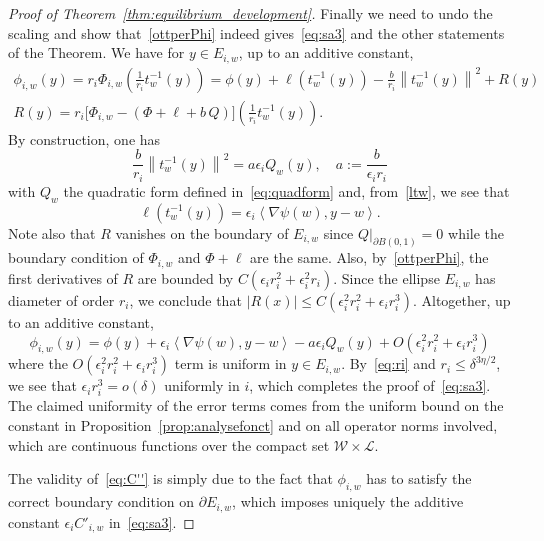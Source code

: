 \documentclass[AHL,Unicode,longabstracts,published]{cedram}
\newcommand{\clL}{\mathcal{L}}
\newcommand{\clW}{\mathcal{W}}
\newcommand{\eps}{\epsilon}
\begin{document}
\begin{proof}[Proof of Theorem~\ref{thm:equilibrium_development}]
Finally we need to undo the scaling and show that~\eqref{ottperPhi} indeed gives~\eqref{eq:sa3} and the other statements of the Theorem. We have for $y\in E_{i,w}$, up to an additive constant,
\begin{multline}
\phi_{i,w}(y)=r_i\Phi_{i,w}\left(\frac1{r_i}t_w^{-1}(y)\right)=\phi(y)+\ell\left(t_w^{-1}(y)\right)-\frac b{r_i} \left\|t_w^{-1} (y)\right\|^2+R(y)\\
R(y)={r_i}\Big[\Phi_{i,w}-(\Phi+\ell+b\, Q)\Big]\left(\frac1{r_i}t^{-1}_w(y)\right).
\end{multline}
By construction, one has
\begin{equation}
\frac b{r_i} \left\|t_w^{-1} (y)\right\|^2=a\epsilon_i Q_w(y),\quad a:=\frac b{\epsilon_i r_i}
\end{equation}
with $Q_w$ the quadratic form defined in~\eqref{eq:quadform} and, from~\eqref{ltw}, we see that
\begin{equation}
\ell\left(t_w^{-1}(y)\right)=\epsilon_i \left\langle\nabla\psi(w),y-w\right\rangle.
\end{equation}
Note also that $R$ vanishes on the boundary of $E_{i,w}$ since $Q|_{\partial B(0,1)}=0$ while the boundary condition of $\Phi_{i,w}$ and $\Phi+\ell$ are the same. Also, by~\eqref{ottperPhi}, the first derivatives of $R$ are bounded by $C(\epsilon_i r_i^2+\epsilon_i^2 r_i)$. Since the ellipse $E_{i,w}$ has diameter of order $r_i$, we conclude that $|R(x)|\le C (\eps_i^2 r_i^2+ \eps_i r_i^3)$. Altogether, up to an additive constant,
\begin{equation}
\phi_{i,w} (y)= \phi(y)+\epsilon_i \left\langle \nabla\psi(w), y-w\right\rangle -a\epsilon_i Q_w (y)+ O\left(\eps_i^2 r_i^2+ \eps_i r_i^3\right)
\end{equation}
where the $O(\eps_i^2 r_i^2+ \eps_i r_i^3) $ term is uniform in $y\in E_{i,w}$. By~\eqref{eq:ri} and $r_i\le \delta^{3
\eta/2}$, we see that $\epsilon_i r_i^3=o(\delta)$ uniformly in $i$, which completes the proof of~\eqref{eq:sa3}. The claimed uniformity of the error terms comes from the uniform bound on the constant in Proposition~\ref{prop:analysefonct} and on all operator norms involved, which are continuous functions over the compact set $\clW \times \clL$.



The validity of~\eqref{eq:C''} is simply due to the fact that $\phi_{i,w}$ has to satisfy the correct boundary condition on $\partial E_{i,w}$, which imposes uniquely the additive constant $\epsilon_i C'_{i,w}$ in~\eqref{eq:sa3}.



\end{proof}
\end{document}
